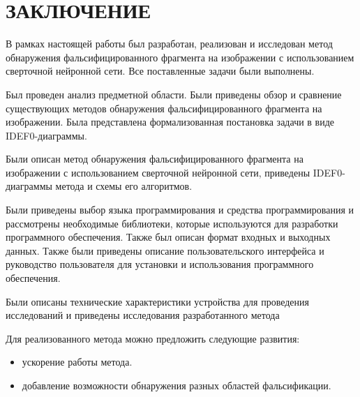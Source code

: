 \part*{ЗАКЛЮЧЕНИЕ}
В рамках настоящей работы был разработан, реализован и исследован метод обнаружения фальсифицированного фрагмента на изображении с использованием сверточной нейронной сети. Все поставленные задачи были выполнены.

Был проведен анализ предметной области. Были приведены обзор и сравнение существующих методов обнаружения фальсифицированного фрагмента на изображении. Была представлена формализованная постановка задачи в виде IDEF0-диаграммы.

Были описан метод обнаружения фальсифицированного фрагмента на изображении с использованием сверточной нейронной сети, приведены IDEF0-диаграммы метода и схемы его алгоритмов.

Были приведены выбор языка программирования и средства программирования и рассмотрены необходимые библиотеки, которые используются для разработки программного обеспечения. Также был описан формат входных и выходных данных. Также были приведены описание пользовательского интерфейса и руководство пользователя для установки и использования программного обеспечения.

Были описаны технические характеристики устройства для проведения исследований и приведены исследования разработанного метода

Для реализованного метода можно предложить следующие развития:
\begin{itemize}[label = ---]
    \item ускорение работы метода.
    \item добавление возможности обнаружения разных областей фальсификации.
\end{itemize}

